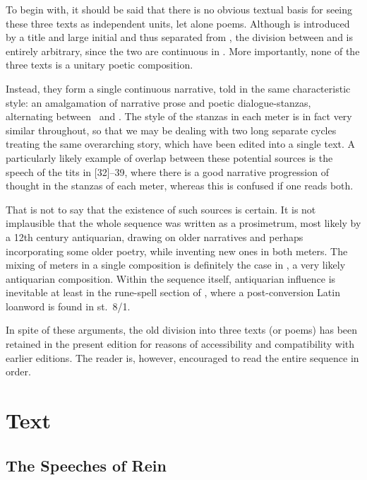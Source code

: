 To begin with, it should be said that there is no obvious textual basis for seeing these three texts as independent units, let alone poems.  Although  is introduced by a title and large initial and thus separated from , the division between  and  is entirely arbitrary, since the two are continuous in \Regius.  More importantly, none of the three texts is a unitary poetic composition.

Instead, they form a single continuous narrative, told in the same characteristic style: an amalgamation of narrative prose and poetic dialogue-stanzas, alternating between \Fornyrdislag\ and \Ljodahattr.  The style of the stanzas in each meter is in fact very similar throughout, so that we may be dealing with two long separate cycles treating the same overarching story, which have been edited into a single text.  A particularly likely example of overlap between these potential sources is the speech of the tits in [32]--39, where there is a good narrative progression of thought in the stanzas of each meter, whereas this is confused if one reads both.

That is not to say that the existence of such sources is certain.  It is not implausible that the whole sequence was written as a prosimetrum, most likely by a 12th century antiquarian, drawing on older narratives and perhaps incorporating some older poetry, while inventing new ones in both meters.  The mixing of meters in a single composition is definitely the case in , a very likely antiquarian composition.  Within the sequence itself, antiquarian influence is inevitable at least in the rune-spell section of , where a post-conversion Latin loanword is found in st.~8/1.

In spite of these arguments, the old division into three texts (or poems) has been retained in the present edition for reasons of accessibility and compatibility with earlier editions.  The reader is, however, encouraged to read the entire sequence in order.

\newpage

\section{Text}

\subsection{The Speeches of Rein}

